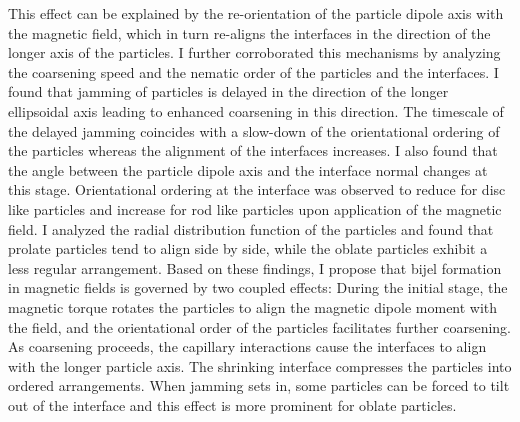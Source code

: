 This effect can
be explained by the re-orientation of the particle dipole axis with the
magnetic field, which in turn re-aligns the interfaces in the direction
of the longer axis of the particles. I further corroborated this
mechanisms by analyzing the coarsening speed and the nematic order of
the particles and the interfaces. I found that jamming of particles is
delayed in the direction of the longer ellipsoidal axis leading to
enhanced coarsening in this direction. The timescale of the delayed
jamming coincides with a slow-down of the orientational ordering of the
particles whereas the alignment of the interfaces increases. I also
found that the angle between the particle dipole axis and the interface
normal changes at this stage. Orientational ordering at the interface was
observed to reduce for disc like particles and increase for rod like
particles upon application of the magnetic field. I analyzed the radial
distribution function of the particles and found that prolate particles
tend to align side by side, while the oblate particles exhibit a less
regular arrangement. Based on these findings, I propose that bijel
formation in magnetic fields is governed by two coupled effects: During
the initial stage, the magnetic torque rotates the particles to align
the magnetic dipole moment with the field, and the orientational order
of the particles facilitates further coarsening. As coarsening proceeds,
the capillary interactions cause the interfaces to align with the longer
particle axis. The shrinking interface compresses the particles into
ordered arrangements. When jamming sets in, some particles can be forced
to tilt out of the interface and this effect is more prominent for
oblate particles.

